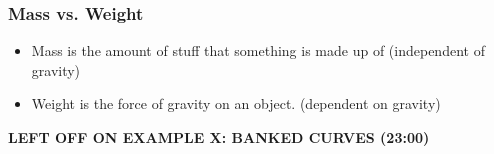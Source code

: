 \documentclass[12pt]{article}
\theoremstyle{break}
\numberwithin{theorem}{subsection}
\numberwithin{lemma}{subsection}
\numberwithin{corollary}{subsection}
\numberwithin{equation}{subsection}
\begin{document}
\subsubsection{Mass vs. Weight}
\begin{itemize}
	\item Mass is the amount of stuff that something is made up of (independent of gravity)
	\item Weight is the force of gravity on an object. (dependent on gravity)
\end{itemize}

\textbf{LEFT OFF ON EXAMPLE X: BANKED CURVES (23:00)}
\end{document}

